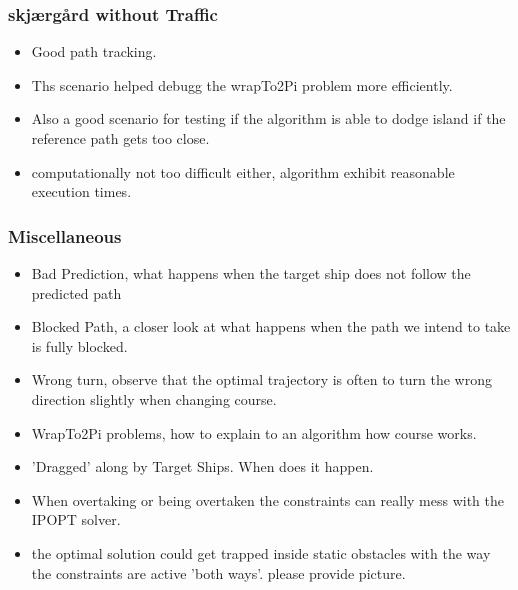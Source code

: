 \subsubsection{skjærgård without Traffic}
\begin{itemize}
    \item Good path tracking.
    \item Ths scenario helped debugg the wrapTo2Pi problem more efficiently.
    \item Also a good scenario for testing if the algorithm is able to dodge island if the reference path gets too close.
    \item computationally not too difficult either, algorithm exhibit reasonable execution times.
\end{itemize}

\subsubsection{Miscellaneous}
\begin{itemize}
    \item Bad Prediction, what happens when the target ship does not follow the predicted path
    \item Blocked Path, a closer look at what happens when the path we intend to take is fully blocked.
    \item Wrong turn, observe that the optimal trajectory is often to turn the wrong direction slightly when changing course.
    \item WrapTo2Pi problems, how to explain to an algorithm how course works.
    \item 'Dragged' along by Target Ships. When does it happen.
    \item When overtaking or being overtaken the constraints can really mess with the \gls{IPOPT} solver.
    \item the optimal solution could get trapped inside static obstacles with the way the constraints are active 'both ways'. please provide picture.
\end{itemize}

